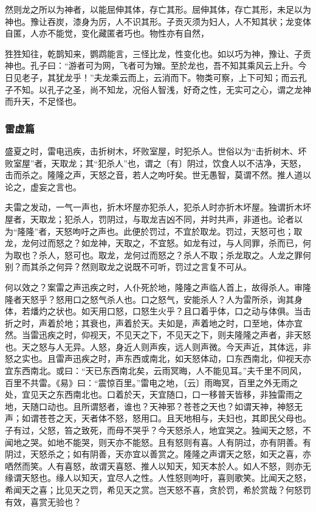 \documentclass[]{article}
\begin{document}
然则龙之所以为神者，以能屈伸其体，存亡其形。屈伸其体，存亡其形，未足以为神也。豫让吞炭，漆身为厉，人不识其形。子贡灭须为妇人，人不知其状；龙变体自匿，人亦不能觉，变化藏匿者巧也。物性亦有自然，

狌狌知往，乾鹊知来，鹦鹉能言，三怪比龙，性变化也。如以巧为神，豫让、子贡神也。孔子曰：``游者可为网，飞者可为矰。至於龙也，吾不知其乘风云上升。今日见老子，其犹龙乎！''夫龙乘云而上，云消而下。物类可察，上下可知；而云孔子不知。以孔子之圣，尚不知龙，况俗人智浅，好奇之性，无实可之心，谓之龙神而升天，不足怪也。

\hypertarget{header-n239}{%
\subsubsection{雷虚篇}\label{header-n239}}

盛夏之时，雷电迅疾，击折树木，坏败室屋，时犯杀人。世俗以为``击折树木、坏败室屋''者，天取龙；其``犯杀人''也，谓之〔有〕阴过，饮食人以不洁净，天怒，击而杀之。隆隆之声，天怒之音，若人之呴吁矣。世无愚智，莫谓不然。推人道以论之，虚妄之言也。

夫雷之发动，一气一声也，折木坏屋亦犯杀人，犯杀人时亦折木坏屋。独谓折木坏屋者，天取龙；犯杀人，罚阴过，与取龙吉凶不同，并时共声，非道也。论者以为``隆隆''者，天怒呴吁之声也。此便於罚过，不宜於取龙。罚过，天怒可也；取龙，龙何过而怒之？如龙神，天取之，不宜怒。如龙有过，与人同罪，杀而已，何为取也？杀人，怒可也。取龙，龙何过而怒之？杀人不取；杀龙取之。人龙之罪何别？而其杀之何异？然则取龙之说既不可听，罚过之言复不可从。

何以效之？案雷之声迅疾之时，人仆死於地，隆隆之声临人首上，故得杀人。审隆隆者天怒乎？怒用口之怒气杀人也。口之怒气，安能杀人？人为雷所杀，询其身体，若燔灼之状也。如天用口怒，口怒生火乎？且口着乎体，口之动与体俱。当击折之时，声着於地；其衰也，声着於天。夫如是，声着地之时，口至地，体亦宜然。当雷迅疾之时，仰视天，不见天之下，不见天之下，则夫隆隆之声者，非天怒也。天之怒与人无异。人怒，身近人则声疾，远人则声微。今天声近，其体远，非怒之实也。且雷声迅疾之时，声东西或南北，如天怒体动，口东西南北，仰视天亦宜东西南北。或曰：``天已东西南北矣，云雨冥晦，人不能见耳。''夫千里不同风，百里不共雷。《易》曰：``震惊百里。''雷电之地，〔云〕雨晦冥，百里之外无雨之处，宜见天之东西南北也。口着於天，天宜随口，口一移普天皆移，非独雷雨之地，天随口动也。且所谓怒者，谁也？天神邪？苍苍之天也？如谓天神，神怒无声；如谓苍苍之天，天者体不怒，怒用口。且天地相与，夫妇也，其即民父母也。子有过，父怒，笞之致死，而母不哭乎？今天怒杀人，地宜哭之。独闻天之怒，不闻地之哭。如地不能哭，则天亦不能怒。且有怒则有喜。人有阴过，亦有阴善。有阴过，天怒杀之；如有阴善，天亦宜以善赏之。隆隆之声谓天之怒，如天之喜，亦哂然而笑。人有喜怒，故谓天喜怒、推人以知天，知天本於人。如人不怒，则亦无缘谓天怒也。缘人以知天，宜尽人之性。人性怒则呴吁，喜则歌笑。比闻天之怒，希闻天之喜；比见天之罚，希见天之赏。岂天怒不喜，贪於罚，希於赏哉？何怒罚有效，喜赏无验也？
\end{document}
